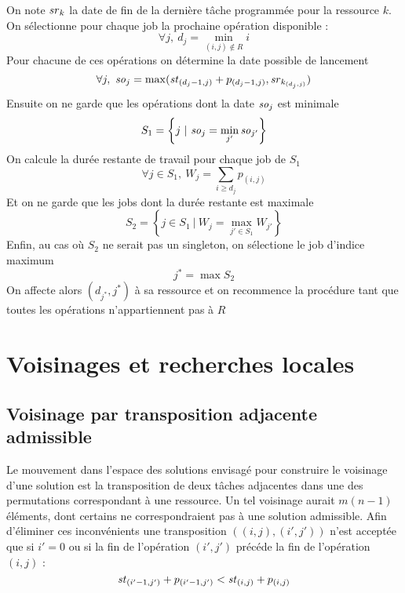 \documentclass[french]{rapport}
\begin{document}
On note $\mathit{sr}_k$ la date de fin de la dernière tâche programmée pour la ressource $k$. On sélectionne
pour chaque job la prochaine opération disponible :
$$ \forall j,~d_j = \min_{(i,j) \notin R} i $$
Pour chacune de ces opérations on détermine la date possible de lancement
$$ \forall j,~\mathit{so}_j = \max (\mathit{st}_{(d_j-1,j)} + p_{(d_j-1,j)}, \mathit{sr}_{k_{(d_j,j)}}) $$
Ensuite on ne garde que les opérations dont la date $\mathit{so}_j$ est minimale
$$ S_1 = \left\{ j ~|~ \mathit{so}_j = \min_{j'} {\mathit{so}_{j'}} \right\} $$
On calcule la durée restante de travail pour chaque job de $S_1$
$$ \forall j \in S_1,~ W_j = \sum_{i \geq d_j}{p_{(i,j)}} $$
Et on ne garde que les jobs dont la durée restante est maximale
$$ S_2 = \left\{ j \in S_1 ~|~ W_j = \max_{j' \in S_1}{W_{j'}} \right\} $$
Enfin, au cas où $S_2$ ne serait pas un singleton, on sélectione le job d'indice maximum
$$ j^* = \max S_2 $$
On affecte alors $(d_{j^*}, j^*)$ à sa ressource et on recommence la procédure tant que toutes les
opérations n'appartiennent pas à $R$



\section{Voisinages et recherches locales}

\subsection{Voisinage par transposition adjacente admissible}

Le mouvement dans l'espace des solutions envisagé pour construire le voisinage d'une solution est la
transposition de deux tâches adjacentes dans une des permutations correspondant à une ressource. Un
tel voisinage aurait $m (n - 1)$ éléments, dont certains ne correspondraient pas à une solution
admissible. Afin d'éliminer ces inconvénients une transposition $((i,j),(i',j'))$ n'est acceptée que
si $i' = 0$ ou si la fin de l'opération $(i',j')$ précéde la fin de l'opération $(i,j)$ :
\begin{equation} \label{eq:admis_transp}
  \mathit{st}_{(i'-1,j')} + p_{(i'-1,j')} < \mathit{st}_{(i,j)} + p_{(i,j)}
\end{equation}
\end{document}
